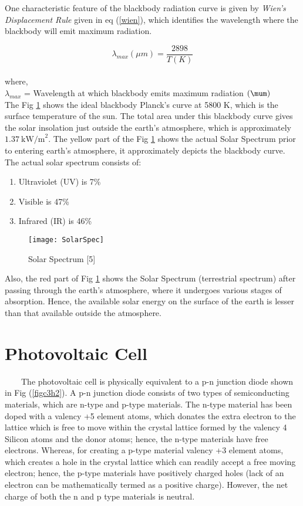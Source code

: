 One characteristic feature of the blackbody radiation curve is given by \textit{Wien's Displacement Rule} given in eq (\ref{wien}), which identifies the wavelength where the blackbody will emit maximum radiation.

\begin{equation}
\label{wien}
\lambda_{{max}}(\mu m)=\frac{2898}{T(K)}
\end{equation}\\
where,\\
$ \lambda_{max} $ = Wavelength at which blackbody emits maximum radiation $ (\mum) $ \\

The Fig \ref{figc3h1} shows the ideal blackbody Planck's curve at 5800 K, which is the surface temperature of the sun. The total area under this blackbody curve gives the solar insolation just outside the earth's atmosphere, which is approximately $1.37 \ \text{kW/m}^{2}$. The yellow part of the Fig \ref{figc3h1} shows the actual Solar Spectrum prior to entering earth's atmosphere, it approximately depicts the blackbody curve. The actual solar spectrum consists of:

\begin{enumerate}
\item Ultraviolet (UV) is 7\%
\item Visible is 47\%
\item Infrared (IR) is 46\%
\end{enumerate}

\begin{figure}[H]
\centering
\texttt{[image: SolarSpec]}
\caption{Solar Spectrum [5]}
\label{figc3h1} %
\end{figure}

Also, the red part of Fig \ref{figc3h1} shows the Solar Spectrum (terrestrial spectrum) after passing through the earth's atmosphere, where it undergoes various stages of absorption. Hence, the available solar energy on the surface of the earth is lesser than that available outside the atmosphere. 

\section{Photovoltaic Cell}
\
\
\
\
The photovoltaic cell is physically equivalent to a p-n junction diode shown in Fig (\ref{figc3h2}). A p-n junction diode consists of two types of semiconducting materials, which are n-type and p-type materials. The n-type material has been doped with a valency +5 element atoms, which donates the extra electron to the lattice which is free to move within the crystal lattice formed by the valency 4 Silicon atoms and the donor atoms; hence, the n-type materials have free electrons. Whereas, for creating a p-type material valency +3 element atoms, which creates a hole in the crystal lattice which can readily accept a free moving electron; hence, the p-type materials have positively charged holes (lack of an electron can be mathematically termed as a positive charge). However, the net charge of both the n and p type materials is neutral.

